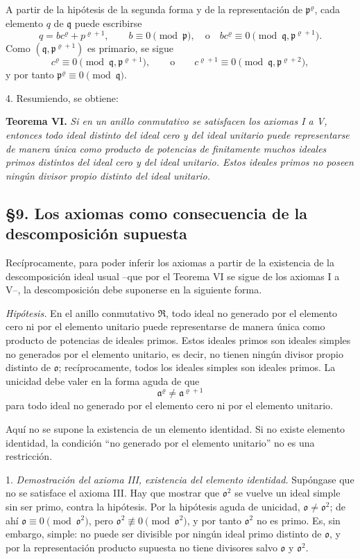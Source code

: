 \documentclass[11pt]{article}
\providecommand{\mR}{\mathfrak{R}}
\providecommand{\ma}{\mathfrak{a}}
\providecommand{\mo}{\mathfrak{o}}
\providecommand{\mpideal}{\mathfrak{p}}
\providecommand{\mq}{\mathfrak{q}}
\begin{document}
A partir de la hipótesis de la segunda forma y de la representación de $\mpideal^\varrho$, cada elemento $q$ de $\mq$ puede escribirse
\[
        q=b c^\varrho+p^{\varrho+1},
        \qquad b\equiv0\pmod{\mpideal},
        \quad\text{o}\quad b c^\varrho\equiv0\pmod{\mq,\mpideal^{\varrho+1}}.
\]
Como $(\mq,\mpideal^{\varrho+1})$ es primario, se sigue
\[
        c^\varrho\equiv0\pmod{\mq,\mpideal^{\varrho+1}},
        \qquad\text{o}\qquad
        c^{\varrho+1}\equiv0\pmod{\mq,\mpideal^{\varrho+2}},
\]
y por tanto $\mpideal^\varrho\equiv0\pmod{\mq}$.

4. Resumiendo, se obtiene:

\textbf{Teorema VI.} \emph{Si en un anillo conmutativo se satisfacen los axiomas I a V, entonces todo ideal distinto del ideal cero y del ideal unitario puede representarse de manera única como producto de potencias de finitamente muchos ideales primos distintos del ideal cero y del ideal unitario. Estos ideales primos no poseen ningún divisor propio distinto del ideal unitario.}

\subsection*{§9. Los axiomas como consecuencia de la descomposición supuesta}

Recíprocamente, para poder inferir los axiomas a partir de la existencia de la descomposición ideal usual --que por el Teorema VI se sigue de los axiomas I a V--, la descomposición debe suponerse en la siguiente forma.

\emph{Hipótesis.} En el anillo conmutativo $\mR$, todo ideal no generado por el elemento cero ni por el elemento unitario puede representarse de manera única como producto de potencias de ideales primos. Estos ideales primos son ideales simples no generados por el elemento unitario, es decir, no tienen ningún divisor propio distinto de $\mo$; recíprocamente, todos los ideales simples son ideales primos. La unicidad debe valer en la forma aguda de que
\[
        \ma^\varrho\ne\ma^{\varrho+1}
\]
para todo ideal no generado por el elemento cero ni por el elemento unitario.

Aquí no se supone la existencia de un elemento identidad. Si no existe elemento identidad, la condición ``no generado por el elemento unitario'' no es una restricción.

1. \emph{Demostración del axioma III, existencia del elemento identidad.} Supóngase que no se satisface el axioma III. Hay que mostrar que $\mo^2$ se vuelve un ideal simple sin ser primo, contra la hipótesis. Por la hipótesis aguda de unicidad, $\mo\ne\mo^2$; de ahí $\mo\equiv0\pmod{\mo^2}$, pero $\mo^2\not\equiv0\pmod{\mo^2}$, y por tanto $\mo^2$ no es primo. Es, sin embargo, simple: no puede ser divisible por ningún ideal primo distinto de $\mo$, y por la representación producto supuesta no tiene divisores salvo $\mo$ y $\mo^2$.
\end{document}
